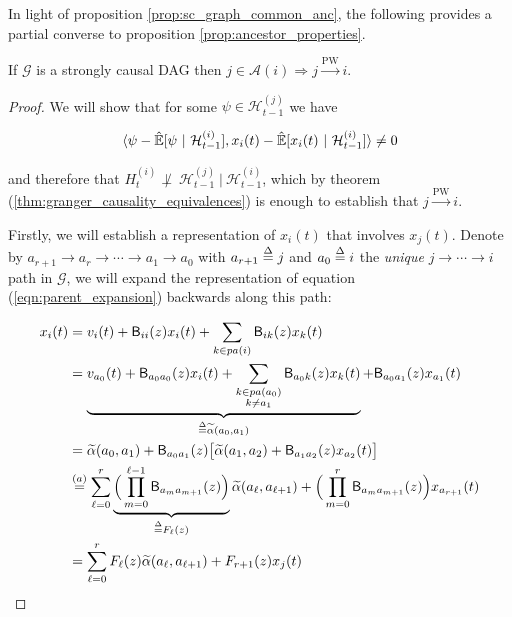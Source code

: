 \documentclass[12pt]{article}
\def\pwgc{\overset{\text{PW}}{\rightarrow}}  %
\def\gcg{\mathcal{G}}  %
\def\B{\mathsf{B}}  %
\def\H{\mathcal{H}}  %
\newcommand{\linE}[2]{\hat{\E}[#1\ |\ #2]}  %
\newcommand{\pa}[1]{pa(#1)}  %
\newcommand{\anc}[1]{\mathcal{A}(#1)}  %
\newcommand{\wtalpha}[2]{\widetilde{\alpha}(#1, #2)}  %
\newcommand{\gcgpath}[2]{#1 \rightarrow \cdots \rightarrow #2}  %
\begin{document}

In light of proposition \ref{prop:sc_graph_common_anc}, the following
provides a partial converse to proposition \ref{prop:ancestor_properties}.

\begin{proposition}
  \label{prop:pwgc_anc}
  If $\gcg$ is a strongly causal DAG then $j \in \anc{i} \Rightarrow j \pwgc i$.
\end{proposition}
\begin{proof}
  We will show that for some $\psi \in \H_{t - 1}^{(j)}$ we have

  \begin{equation}
    \label{eqn:cond_ortho_proof}
    \inner{\psi - \linE{\psi}{\H_{t - 1}^{(i)}}}{x_i(t) - \linE{x_i(t)}{\H_{t - 1}^{(i)}}} \ne 0
  \end{equation}

  and therefore that $H_t^{(i)} \not\perp\ \H_{t - 1}^{(j)}\ |\ \H_{t - 1}^{(i)}$, which by theorem (\ref{thm:granger_causality_equivalences}) is enough to establish that $j \pwgc i$.

  Firstly, we will establish a representation of $x_i(t)$ that involves $x_j(t)$.  Denote by $a_{r + 1} \rightarrow a_r \rightarrow \cdots \rightarrow a_1 \rightarrow a_0$ with $a_{r + 1} \overset{\Delta}{=} j$ and $a_0 \overset{\Delta}{=} i$ the \textit{unique} $\gcgpath{j}{i}$ path in $\gcg$, we will expand the representation of equation (\ref{eqn:parent_expansion}) backwards along this path:

  \begin{align*}
    x_i(t) &= v_i(t) + \B_{ii}(z) x_i(t) + \sum_{k \in \pa{i}}\B_{ik}(z) x_k(t)\\
           &= \underbrace{v_{a_0}(t) + \B_{a_0a_0}(z) x_i(t) + \sum_{\substack{k \in \pa{a_0} \\ k \ne a_1}}\B_{a_0 k}(z) x_k(t)}_{\defeq \wtalpha{a_0}{a_1}} + \B_{a_0a_1}(z)x_{a_1}(t)\\
           &= \wtalpha{a_0}{a_1} + \B_{a_0a_1}(z)\big[\wtalpha{a_1}{a_2} + \B_{a_1a_2}(z)x_{a_2}(t) \big]\\
           &\overset{(a)}{=} \sum_{\ell = 0}^r \underbrace{\Big(\prod_{m = 0}^{\ell - 1} \B_{a_m a_{m + 1}}(z) \Big)}_{\defeq F_\ell(z)} \wtalpha{a_\ell}{a_{\ell + 1}} + \Big(\prod_{m = 0}^{r}\B_{a_m a_{m + 1}}(z)\Big)x_{a_{r + 1}}(t)\\
           &= \sum_{\ell = 0}^r F_\ell(z) \wtalpha{a_\ell}{a_{\ell + 1}} + F_{r + 1}(z) x_j(t)
  \end{align*}


\end{proof}
\end{document}
